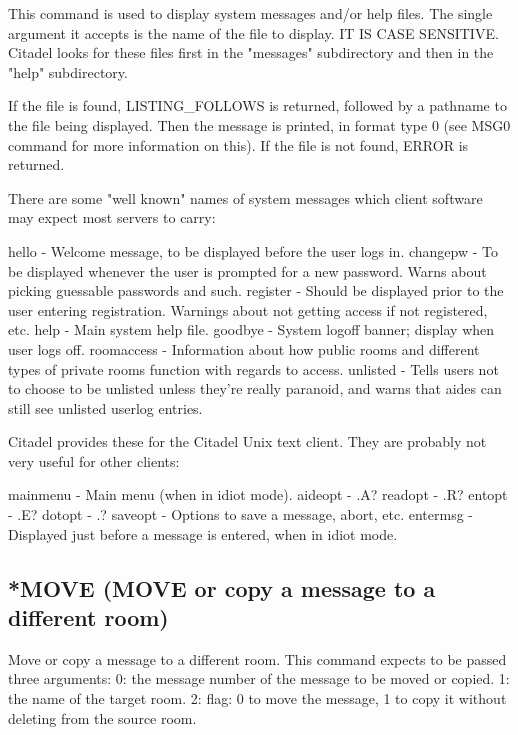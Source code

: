  This command is used to display system messages and/or help files.  The
single argument it accepts is the name of the file to display.  IT IS CASE
SENSITIVE.  Citadel looks for these files first in the "messages"
subdirectory and then in the "help" subdirectory.

 If the file is found, LISTING_FOLLOWS is returned, followed by a pathname
to the file being displayed.  Then the message is printed, in format type 0
(see MSG0 command for more information on this).  If the file is not found,
ERROR is returned.

 There are some "well known" names of system messages which client software
may expect most servers to carry:

 hello        -  Welcome message, to be displayed before the user logs in.
 changepw     -  To be displayed whenever the user is prompted for a new
                 password.  Warns about picking guessable passwords and such.
 register     -  Should be displayed prior to the user entering registration.
                 Warnings about not getting access if not registered, etc.
 help         -  Main system help file.
 goodbye      -  System logoff banner; display when user logs off.
 roomaccess   -  Information about how public rooms and different types of
                 private rooms function with regards to access.
 unlisted     -  Tells users not to choose to be unlisted unless they're
                 really paranoid, and warns that aides can still see
                 unlisted userlog entries.

 Citadel provides these for the Citadel Unix text client.  They are
probably not very useful for other clients:

 mainmenu     -  Main menu (when in idiot mode).
 aideopt      -  .A?
 readopt      -  .R?
 entopt       -  .E?
 dotopt       -  .?
 saveopt      -  Options to save a message, abort, etc.
 entermsg     -  Displayed just before a message is entered, when in
                 idiot mode.



\subsection{*MOVE (MOVE or copy a message to a different room)}

 Move or copy a message to a different room.  This command expects to be
passed three arguments:
 0: the message number of the message to be moved or copied.
 1: the name of the target room.
 2: flag: 0 to move the message, 1 to copy it without deleting from the
    source room.

